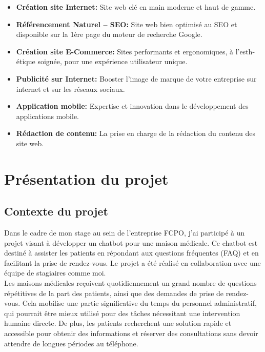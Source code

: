 \begin{itemize}
  \item \textbf{Création site Internet: }Site web clé en main moderne et haut de gamme.
  \item \textbf{Référencement Naturel – SEO: }Site web bien optimisé au SEO et disponible sur la 1ère page du moteur de recherche Google.
  \item \textbf{Création site E-Commerce: }Sites performants et ergonomiques, à l'esth-étique soignée, pour une expérience utilisateur unique.
  \item \textbf{Publicité sur Internet: }Booster l'image de marque de votre entreprise sur internet et sur les réseaux sociaux.
  \item \textbf{Application mobile: }Expertise et innovation dans le développement des applications mobile.
  \item \textbf{Rédaction de contenu: }La prise en charge de la rédaction du contenu des site web.

\end{itemize}






\section{Présentation du projet}


\subsection{Contexte du projet}

\hspace{16pt}Dans le cadre de mon stage au sein de l'entreprise FCPO, j'ai participé à un projet visant à développer un chatbot pour une maison médicale. Ce chatbot est destiné à assister les patients en répondant aux questions fréquentes (FAQ) et en facilitant la prise de rendez-vous. Le projet a été réalisé en collaboration avec une équipe de stagiaires comme moi.\\

Les maisons médicales reçoivent quotidiennement un grand nombre de questions répétitives de la part des patients, ainsi que des demandes de prise de rendez-vous. Cela mobilise une partie significative du temps du personnel administratif, qui pourrait être mieux utilisé pour des tâches nécessitant une intervention humaine directe. De plus, les patients recherchent une solution rapide et accessible pour obtenir des informations et réserver des consultations sans devoir attendre de longues périodes au téléphone.\\

